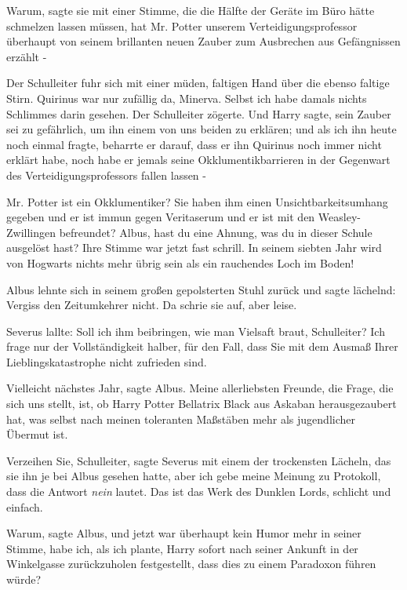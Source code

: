 \glqq{}Warum\grqq{}, sagte sie mit einer Stimme, die die Hälfte der Geräte im
Büro hätte schmelzen lassen müssen, \glqq{}hat Mr. Potter unserem
Verteidigungsprofessor überhaupt von seinem brillanten neuen Zauber zum
Ausbrechen aus Gefängnissen erzählt -\grqq{}

Der Schulleiter fuhr sich mit einer müden, faltigen Hand über die ebenso faltige
Stirn. \glqq{}Quirinus war nur zufällig da, Minerva. Selbst ich habe damals
nichts Schlimmes darin gesehen.\grqq{} Der Schulleiter zögerte. \glqq{}Und Harry
sagte, sein Zauber sei zu gefährlich, um ihn einem von uns beiden zu erklären;
und als ich ihn heute noch einmal fragte, beharrte er darauf, dass er ihn
Quirinus noch immer nicht erklärt habe, noch habe er jemals seine
Okklumentikbarrieren in der Gegenwart des Verteidigungsprofessors fallen lassen
-\grqq{}

\glqq{}Mr. Potter ist ein Okklumentiker? Sie haben ihm einen
Unsichtbarkeitsumhang gegeben und er ist immun gegen Veritaserum und er ist mit
den Weasley-Zwillingen befreundet? Albus, hast du eine Ahnung, was du in dieser
Schule ausgelöst hast?\grqq{} Ihre Stimme war jetzt fast schrill. \glqq{}In
seinem siebten Jahr wird von Hogwarts nichts mehr übrig sein als ein rauchendes
Loch im Boden!\grqq{}

Albus lehnte sich in seinem großen gepolsterten Stuhl zurück und sagte lächelnd:
\glqq{}Vergiss den Zeitumkehrer nicht.\grqq{} Da schrie sie auf, aber leise.

Severus lallte: \glqq{}Soll ich ihm beibringen, wie man Vielsaft braut,
Schulleiter? Ich frage nur der Vollständigkeit halber, für den Fall, dass Sie
mit dem Ausmaß Ihrer Lieblingskatastrophe nicht zufrieden sind.\grqq{}

\glqq{}Vielleicht nächstes Jahr\grqq{}, sagte Albus. \glqq{}Meine allerliebsten
Freunde, die Frage, die sich uns stellt, ist, ob Harry Potter Bellatrix Black
aus Askaban herausgezaubert hat, was selbst nach meinen toleranten Maßstäben
mehr als jugendlicher Übermut ist.\grqq{}

\glqq{}Verzeihen Sie, Schulleiter\grqq{}, sagte Severus mit einem der trockensten
Lächeln, das sie ihn je bei Albus gesehen hatte, \glqq{}aber ich gebe meine
Meinung zu Protokoll, dass die Antwort \emph{nein} lautet. Das ist das Werk des
Dunklen Lords, schlicht und einfach.\grqq{}

\glqq{}Warum\grqq{}, sagte Albus, und jetzt war überhaupt kein Humor mehr in
seiner Stimme, \glqq{}habe ich, als ich plante, Harry sofort nach seiner Ankunft
in der Winkelgasse zurückzuholen festgestellt, dass dies zu einem Paradoxon
führen würde?\grqq{}

